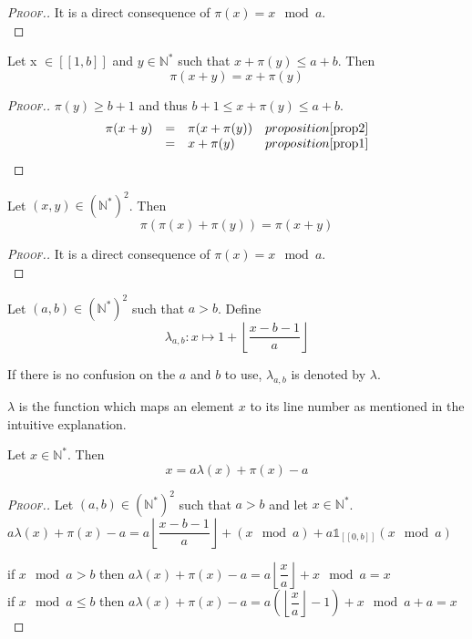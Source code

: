\begin{proof}[\textsc{Proof.}]
It is a direct consequence of \(\pi(x) = x \mod a\). \\
\end{proof}

\begin{proposition}
\label{prop3}
Let x \(\in [\![1,b]\!]\) and \(y \in \mathbb{N}^*\) such that \(x+\pi(y) \leqslant a+b\). Then 
\[
\pi(x+y)=x+\pi(y)
\]
\end{proposition}

\begin{proof}[\textsc{Proof.}]
\(\pi(y) \geqslant b + 1\) and thus \(b + 1 \leqslant x + \pi(y) \leqslant a + b\).
\[
\begin{array}{l l l l}
	\pi(x + y) & = & \pi(x + \pi(y)) & proposition \ref{prop2} \\
	 & = & x + \pi(y) & proposition \ref{prop1}
\end{array}
\]
\end{proof}

\begin{proposition}
\label{prop4}
Let \((x,y)\in (\mathbb{N}^*)^2\). Then 
\[
\pi(\pi(x)+\pi(y))=\pi(x+y)
\]
\end{proposition}

\begin{proof}[\textsc{Proof.}]
It is a direct consequence of \(\pi(x) = x \mod a\). \\
\end{proof}

\begin{definition}
Let \((a,b) \in (\mathbb{N}^*)^2\) such that \(a>b\). Define
\[ \lambda_{a,b}:x \longmapsto 1+ \left\lfloor\dfrac{x-b-1}{a}\right\rfloor\]
\end{definition}

If there is no confusion on the \(a\) and \(b\) to use, \(\lambda_{a, b}\) is denoted by \(\lambda\).

\(\lambda\) is the function which maps an element \(x\) to its line number as mentioned in the intuitive explanation.

\begin{proposition}
\label{prop5}
Let \(x\in \mathbb{N}^*\). Then 
\[
x=a\lambda(x)+\pi(x)-a
\]
\end{proposition}

\begin{proof}[\textsc{Proof.}]
Let \((a,b)\in (\mathbb{N}^*)^2\) such that \(a>b\) and let \(x\in \mathbb{N}^*\). \\
\(a\lambda(x)+\pi(x)-a=a\left\lfloor\dfrac{x-b-1}{a}\right\rfloor+(x \mod a)+ a \mathds{1}_{ [\![0,b]\!]}(x \mod a)\)

\noindent  if \(x \mod a>b\) then \(a\lambda(x)+\pi(x)-a=a\left\lfloor\dfrac{x}{a}\right\rfloor+x \mod a=x\) \\
\vspace{1mm}
\noindent if \(x \mod a \leqslant b\) then
\(a\lambda(x)+\pi(x)-a=a \left( \left \lfloor \dfrac{x}{a} \right \rfloor - 1 \right)+x \mod a +a=x\) \\
\end{proof}


